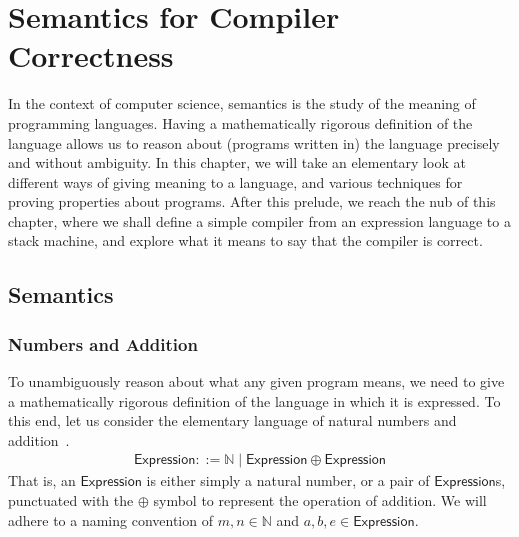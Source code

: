 
\def\prod{\mathrel{::=}}
\def\altn{\mathrel{\mid}}
\def\NT#1{\mathsf{#1}}
\def\Nat{\mathbb{N}}
\def\Expression{\NT{Expression}}

\chapter{Semantics for Compiler Correctness}


In the context of computer science, semantics is the study of the meaning of
programming languages. Having a mathematically rigorous definition of the
language allows us to reason about (programs written in) the language
precisely and without ambiguity. In this chapter, we will take an elementary
look at different ways of giving meaning to a language, and various
techniques for proving properties about programs. After this prelude, we
reach the nub of this chapter, where we shall define a simple compiler from
an expression language to a stack machine, and explore what it means to say
that the compiler is correct.

\section{Semantics}%

\subsection{Numbers and Addition}%

To unambiguously reason about what any given program means, we need to give
a mathematically rigorous definition of the language in which it is
expressed. To this end, let us consider the elementary language of natural
numbers and
addition~\cite{hutton04-exceptions,hutton06-calculating,hutton07-interruptions}.
\begin{gather*}
	\Expression \prod \Nat \altn \Expression \oplus \Expression
\end{gather*}
That is, an $\Expression$ is either simply a natural number, or a pair of
$\Expression$s, punctuated with the $\oplus$ symbol to represent the
operation of addition. We will adhere to a naming convention of $m, n \in
\Nat$ and $a, b, e \in \Expression$.

